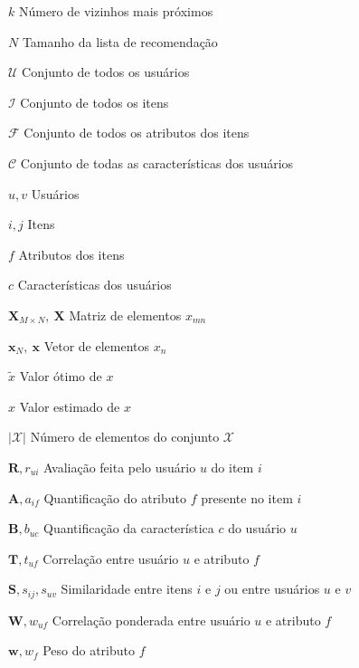 \begin{simbolos}\label{simbolos}
    \item[$k$]  Número de vizinhos mais próximos 
    \item[$N$] Tamanho da lista de recomendação  
    \item[$\mathcal{U}$] Conjunto de todos os usuários 
    \item[$\mathcal{I}$] Conjunto de todos os itens  
    \item[$\mathcal{F}$] Conjunto  de todos os atributos dos itens
    \item[$\mathcal{C}$] Conjunto  de todas as características dos usuários
    \item[$u, v$] Usuários 
    \item[$i, j$] Itens 
    \item[$f$] Atributos dos itens 
    \item[$c $] Características dos usuários  
    \item[$\mathbf{X}_{M \times N},~\mathbf{X}$] Matriz de elementos $x_{mn}$ 
    \item[$\mathbf{x}_{N},~\mathbf{x}$] Vetor de elementos $x_{n}$
    \item[$\tilde{x}$] Valor ótimo de $x$
    \item[$\hat{x}$] Valor estimado de $x$
    \item[$|\mathcal{X}|$] Número de elementos do conjunto $\mathcal{X}$
    \item[$\mathbf{R}, r_{ui}$] Avaliação feita pelo usuário $u$ do item $i$
    \item[$\mathbf{A}, a_{if}$] Quantificação do atributo $f$ presente no item $i$
    \item[$\mathbf{B}, b_{uc}$] Quantificação da característica $c$ do usuário $u$   
    \item[$\mathbf{T}, t_{uf}$] Correlação entre usuário $u$ e atributo $f$
    \item[$\mathbf{S}, s_{ij}, s_{uv}$] Similaridade entre itens $i$ e $j$ ou entre usuários $u$ e $v$
    \item[$\mathbf{W}, w_{uf}$] Correlação ponderada entre usuário $u$ e atributo $f$ 
    \item[$\mathbf{w}, w_{f}$] Peso do atributo $f$
\end{simbolos}
